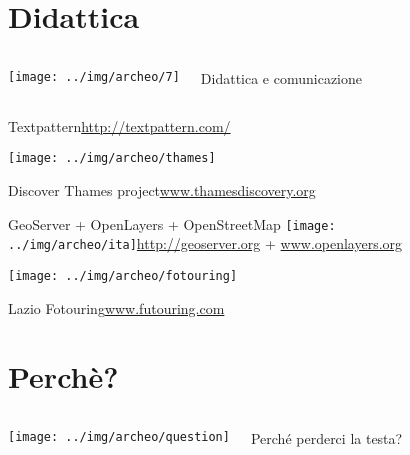 \documentclass[xcolor=svgnames]{beamer}
\begin{document}
	\section{Didattica}

		\begin{frame}
			\begin{columns}[c]
					\begin{center}
						\texttt{[image: ../img/archeo/7]}
					\end{center}
					\Huge Didattica e comunicazione
			\end{columns}
		\end{frame}


		\begin{frame}{Textpattern}{\url{http://textpattern.com/}}
			\begin{center}
				\texttt{[image: ../img/archeo/thames]}
			\end{center}
			Discover Thames project\hfill\url{www.thamesdiscovery.org}
		\end{frame}


		\begin{frame}{GeoServer + OpenLayers + OpenStreetMap\hfill
			\texttt{[image: ../img/archeo/ita]}}{\url{http://geoserver.org} + \url{www.openlayers.org}}
			\begin{center}
				\texttt{[image: ../img/archeo/fotouring]}
			\end{center}
			Lazio Fotouring\hfill\url{www.futouring.com}
		\end{frame}

	\section{Perchè?}

		\begin{frame}
			\begin{columns}[c]
				\column{.4\textwidth}
					\begin{center}
						\texttt{[image: ../img/archeo/question]}
					\end{center}
				\column{.6\textwidth}
					\Huge Perché perderci la testa?
			\end{columns}
		\end{frame}
\end{document}
